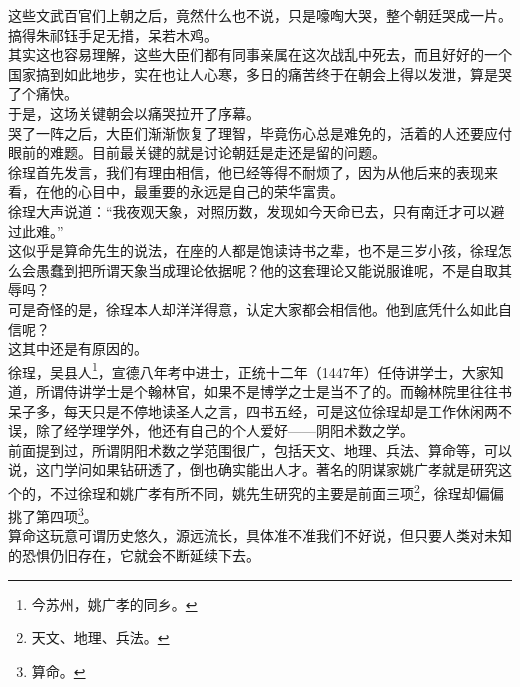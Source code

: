 \begin{multicols}{\theparacolNo}
这些文武百官们上朝之后，竟然什么也不说，只是嚎啕大哭，整个朝廷哭成一片。\\

搞得朱祁钰手足无措，呆若木鸡。\\

其实这也容易理解，这些大臣们都有同事亲属在这次战乱中死去，而且好好的一个国家搞到如此地步，实在也让人心寒，多日的痛苦终于在朝会上得以发泄，算是哭了个痛快。\\

于是，这场关键朝会以痛哭拉开了序幕。\\

哭了一阵之后，大臣们渐渐恢复了理智，毕竟伤心总是难免的，活着的人还要应付眼前的难题。目前最关键的就是讨论朝廷是走还是留的问题。\\

徐珵首先发言，我们有理由相信，他已经等得不耐烦了，因为从他后来的表现来看，在他的心目中，最重要的永远是自己的荣华富贵。\\

徐珵大声说道：“我夜观天象，对照历数，发现如今天命已去，只有南迁才可以避过此难。”\\

这似乎是算命先生的说法，在座的人都是饱读诗书之辈，也不是三岁小孩，徐珵怎么会愚蠢到把所谓天象当成理论依据呢？他的这套理论又能说服谁呢，不是自取其辱吗？\\

可是奇怪的是，徐珵本人却洋洋得意，认定大家都会相信他。他到底凭什么如此自信呢？\\

这其中还是有原因的。\\

徐珵，吴县人\footnote{今苏州，姚广孝的同乡。}，宣德八年考中进士，正统十二年（1447年）任侍讲学士，大家知道，所谓侍讲学士是个翰林官，如果不是博学之士是当不了的。而翰林院里往往书呆子多，每天只是不停地读圣人之言，四书五经，可是这位徐珵却是工作休闲两不误，除了经学理学外，他还有自己的个人爱好——阴阳术数之学。\\

前面提到过，所谓阴阳术数之学范围很广，包括天文、地理、兵法、算命等，可以说，这门学问如果钻研透了，倒也确实能出人才。著名的阴谋家姚广孝就是研究这个的，不过徐珵和姚广孝有所不同，姚先生研究的主要是前面三项\footnote{天文、地理、兵法。}，徐珵却偏偏挑了第四项\footnote{算命。}。\\

算命这玩意可谓历史悠久，源远流长，具体准不准我们不好说，但只要人类对未知的恐惧仍旧存在，它就会不断延续下去。\\


\end{multicols}
